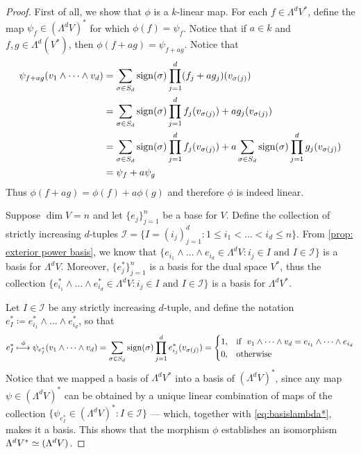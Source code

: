 \begin{proof}
First of all, we show that \(\phi\) is a \(k\)-linear map. For each \(f \in
\Lambda^d V^{*}\), define the map \(\psi_{f} \in (\Lambda^dV)^{*}\) for which
\(\phi(f) = \psi_f\). Notice that if \(a \in k\) and \(f, g \in
\Lambda^d(V^{*})\), then \(\phi(f + a g) = \psi_{f + a g}\). Notice that
\begin{align*}
\psi_{f + ag}(v_1 \wedge \dots \wedge v_d)
&= \sum_{\sigma \in S_d} \operatorname{sign}(\sigma)
  \prod_{j=1}^d (f_{j} + a g_{j})(v_{\sigma(j)}) \\
&= \sum_{\sigma \in S_d} \operatorname{sign}(\sigma)
  \prod_{j=1}^d f_j(v_{\sigma(j)}) + a g_j(v_{\sigma(j)}) \\
&= \sum_{\sigma \in S_d} \operatorname{sign}(\sigma) \prod_{j=1}^d f_j(v_{\sigma(j)})
+ a \sum_{\sigma \in S_d} \operatorname{sign}(\sigma) \prod_{j=1}^d g_j(v_{\sigma(j)}) \\
&= \psi_f + a \psi_g
\end{align*}
Thus \(\phi(f + ag) = \phi(f) + a \phi(g)\) and therefore \(\phi\) is indeed
linear.

Suppose \(\dim V = n\) and let \(\{e_{j}\}_{j=1}^n\) be a base for \(V\). Define
the collection of strictly increasing \(d\)-tuples \(\mathcal I = \{I =
(i_{j})_{j=1}^d \colon 1 \leq i_1 < \dots < i_d \leq n\}\). From \cref{prop: exterior
power basis}, we know that \(\{e_{i_{1}} \wedge \dots \wedge e_{i_{d}} \in
\Lambda^d V \colon i_j \in I \text{ and } I \in \mathcal I\}\) is a basis for
\(\Lambda^d V\). Moreover, \(\{e_{j}^{*}\}_{j=1}^n\) is a basis for the dual
space \(V^{*}\), thus the collection \(\{e_{i_{1}}^{*} \wedge \dots \wedge
e_{i_{d}}^{*} \in \Lambda^d V \colon i_j \in I \text{ and } I \in \mathcal I\}\) is a
basis for \(\Lambda^d V^{*}\).

Let \(I \in \mathcal I\) be any strictly increasing \(d\)-tuple, and define the
notation \(e_I^{*} \coloneq e_{i_1}^{*} \wedge \dots \wedge e_{i_d}^{*}\), so
that
\begin{equation}
\label{eq:basislambda*}
e_I^{*} \overset{\phi}\longmapsto
\psi_{e_I^{*}}(v_1 \wedge \dots \wedge v_d)
= \sum_{\sigma \in S_{d}} \operatorname{sign}(\sigma) \prod_{j=1}^d e_{i_j}^{*}(v_{\sigma(j)}) =
\begin{cases}
  1, &\text{if }\ v_1 \wedge \dots \wedge v_d
        = e_{i_1} \wedge \dots \wedge e_{i_d} \\
  0, &\text{otherwise}
\end{cases}
\end{equation}
Notice that we mapped a basis of \(\Lambda^d V^{*}\) into a basis of
\((\Lambda^d V)^{*}\), since any map \(\psi \in (\Lambda^d V)^{*}\) can be
obtained by a unique linear combination of maps of the collection
\(\{\psi_{e_{I}^{*}} \in (\Lambda^d V)^{*} \colon I \in \mathcal I\}\) --- which,
together with \cref{eq:basislambda*}, makes it a basis. This shows that the
morphism \(\phi\) establishes an isomorphism \(\Lambda^dV^{*} \simeq (\Lambda^d
V)\).
\end{proof}

